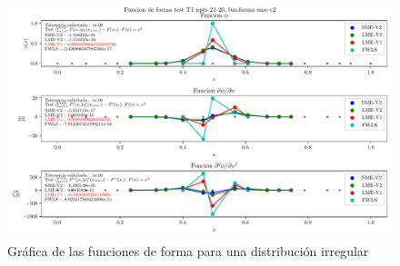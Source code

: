 \begin{figure}
    \centering
    \includegraphics[width=1\textwidth]{./Imagenes/05/T1_21-20_irreg_type-2_direct_10.pdf}
    \caption{Gráfica de las funciones de forma para una distribución irregular} \label{fig:multiple_sf}
\end{figure}


